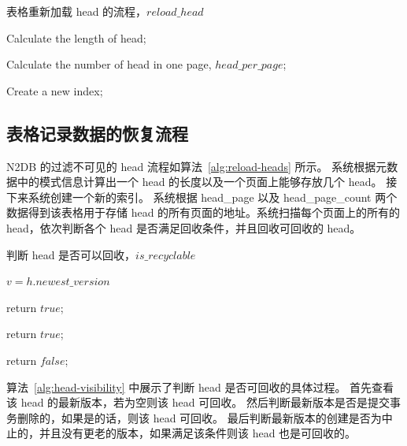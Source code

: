 \begin{algorithm}[ht]
    \caption{表格重新加载 head 的流程，$reload\_head$}
    \label{alg:reload-heads}
    \BlankLine

    Calculate the length of head;

    Calculate the number of head in one page, $head\_per\_page$;

    Create a new index;

    {
    }
\end{algorithm}


\subsection{表格记录数据的恢复流程}
\label{ssec:record-data-recovery}

N2DB 的过滤不可见的 head 流程如算法~\ref{alg:reload-heads} 所示。
系统根据元数据中的模式信息计算出一个 head 的长度以及一个页面上能够存放几个 head。
接下来系统创建一个新的索引。
系统根据 head\_page 以及 head\_page\_count 两个数据得到该表格用于存储 head 的所有页面的地址。系统扫描每个页面上的所有的 head，依次判断各个 head 是否满足回收条件，并且回收可回收的 head。




\begin{algorithm}[ht]
    \caption{判断 head 是否可以回收，$is\_recyclable$}
    \label{alg:head-visibility}
    \BlankLine

    $v = h.newest\_version$



     {
        return $true$;
    }

     {
        return $true$;
    }

    return $false$;


\end{algorithm}

算法~\ref{alg:head-visibility} 中展示了判断 head 是否可回收的具体过程。
首先查看该 head 的最新版本，若为空则该 head 可回收。
然后判断最新版本是否是提交事务删除的，如果是的话，则该 head 可回收。
最后判断最新版本的创建是否为中止的，并且没有更老的版本，如果满足该条件则该 head 也是可回收的。

